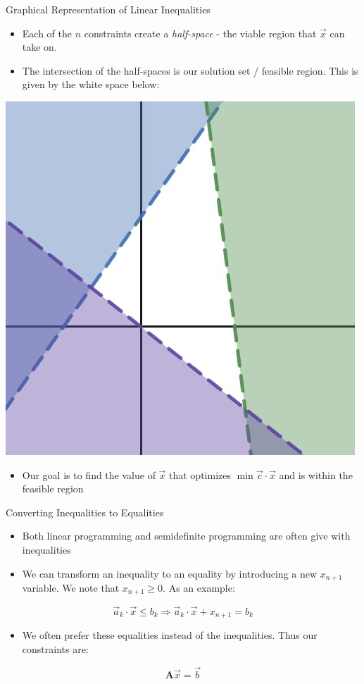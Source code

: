 \documentclass[
	11pt, %
]{beamer}
\begin{document}
\begin{frame}[label={sec:org14df325}]{Graphical Representation of Linear Inequalities}
\begin{itemize}
\item Each of the \(n\) constraints create a \emph{half-space} - the viable region that \( \vec{x} \) can take on.
\item The intersection of the half-spaces is our solution set / feasible region.
This is given by the white space below:
\end{itemize}

\begin{center}
\includegraphics[width=.25\linewidth]{assets/half_space.jpg}
\end{center}

\begin{itemize}
\item Our goal is to find the value of \(\vec{x}\) that optimizes \(\min \vec{c}
  \cdot \vec{x}\) and is within the feasible region
\end{itemize}
\end{frame}

\begin{frame}[label={sec:org09c2276}]{Converting Inequalities to Equalities}
\begin{itemize}
\item Both linear programming and semidefinite programming are often give with
inequalities
\item We can transform an inequality to an equality by introducing a new \(x_{n +
  1}\) variable. We note that \(x_{n + 1} \geq 0\). As an example:
\end{itemize}
\[
\vec{a}_k \cdot \vec{x} \leq b_k \Longrightarrow \vec{a}_k \cdot \vec{x} + x_{n + 1} = b_k
\]

\begin{itemize}
  \item We often prefer these equalities instead of the inequalities.
		Thus our constraints are:
\end{itemize}
\[
\mathbf{A} \vec{x} = \vec{b}
\]

\end{frame}
\end{document}
